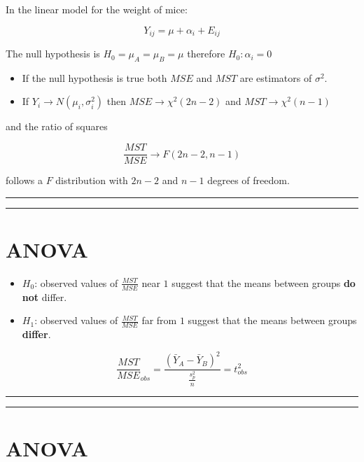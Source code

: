 \documentclass[
]{book}
\begin{document}
In the linear model for the weight of mice:

\[Y_{ij} = \mu + \alpha_i +E_{ij}\]

The null hypothesis is \(H_0=\mu_A=\mu_B=\mu\) therefore \(H_0:\alpha_i=0\)

\begin{itemize}
\item
  If the null hypothesis is true both \(MSE\) and \(MST\) are estimators of \(\sigma^2\).
\item
  If \(Y_i \rightarrow N(\mu_i, \sigma^2_i)\) then \(MSE \rightarrow \chi^2(2n-2)\) and \(MST \rightarrow \chi^2(n-1)\)
\end{itemize}

and the ratio of squares

\[\frac{MST}{MSE} \rightarrow F(2n-2, n-1)\]

follows a \(F\) distribution with \(2n-2\) and \(n-1\) degrees of freedom.

\begin{center}\rule{0.5\linewidth}{0.5pt}\end{center}

\begin{center}\rule{0.5\linewidth}{0.5pt}\end{center}

\hypertarget{anova}{%
\section{ANOVA}\label{anova}}

\begin{itemize}
\item
  \(H_0\): observed values of \(\frac{MST}{MSE}\) near \(1\) suggest that the means between groups \textbf{do not} differ.
\item
  \(H_1\): observed values of \(\frac{MST}{MSE}\) far from \(1\) suggest that the means between groups \textbf{differ}.
\end{itemize}

\[\frac{MST}{MSE}_{obs}=\frac{(\bar{Y}_{A}-\bar{Y}_{B})^2}{\frac{s^2_p}{n}}=t_{obs}^2\]

\begin{center}\rule{0.5\linewidth}{0.5pt}\end{center}

\begin{center}\rule{0.5\linewidth}{0.5pt}\end{center}

\hypertarget{anova-1}{%
\section{ANOVA}\label{anova-1}}
\end{document}
